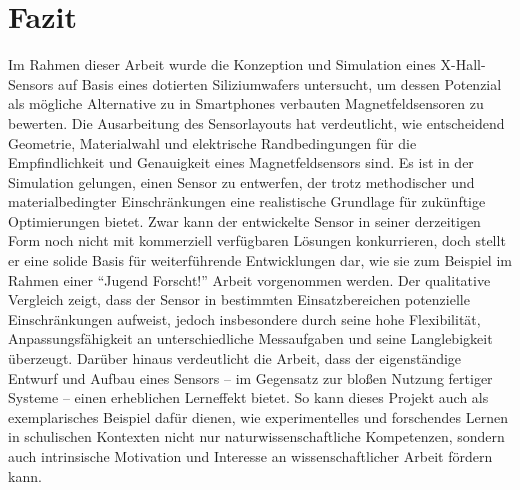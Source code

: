 \documentclass[12pt, a4paper]{article}
\begin{document}
\section{Fazit}
Im Rahmen dieser Arbeit wurde die Konzeption und Simulation eines X-Hall-Sensors auf Basis eines dotierten Siliziumwafers untersucht, um dessen Potenzial als mögliche Alternative zu in Smartphones verbauten Magnetfeldsensoren zu bewerten. Die Ausarbeitung des Sensorlayouts hat verdeutlicht, wie entscheidend Geometrie, Materialwahl und elektrische Randbedingungen für die Empfindlichkeit und Genauigkeit eines Magnetfeldsensors sind.\newline
Es ist in der Simulation gelungen, einen Sensor zu entwerfen, der trotz methodischer und materialbedingter Einschränkungen eine realistische Grundlage für zukünftige Optimierungen bietet. Zwar kann der entwickelte Sensor in seiner derzeitigen Form noch nicht mit kommerziell verfügbaren Lösungen konkurrieren, doch stellt er eine solide Basis für weiterführende Entwicklungen dar, wie sie zum Beispiel im Rahmen einer ``Jugend Forscht!'' Arbeit vorgenommen werden.\newline
Der qualitative Vergleich zeigt, dass der Sensor in bestimmten Einsatzbereichen potenzielle Einschränkungen aufweist, jedoch insbesondere durch seine hohe Flexibilität, Anpassungsfähigkeit an unterschiedliche Messaufgaben und seine Langlebigkeit überzeugt.\newline
Darüber hinaus verdeutlicht die Arbeit, dass der eigenständige Entwurf und Aufbau eines Sensors – im Gegensatz zur bloßen Nutzung fertiger Systeme – einen erheblichen Lerneffekt bietet. So kann dieses Projekt auch als exemplarisches Beispiel dafür dienen, wie experimentelles und forschendes Lernen in schulischen Kontexten nicht nur naturwissenschaftliche Kompetenzen, sondern auch intrinsische Motivation und Interesse an wissenschaftlicher Arbeit fördern kann.
\pagebreak
\end{document}
